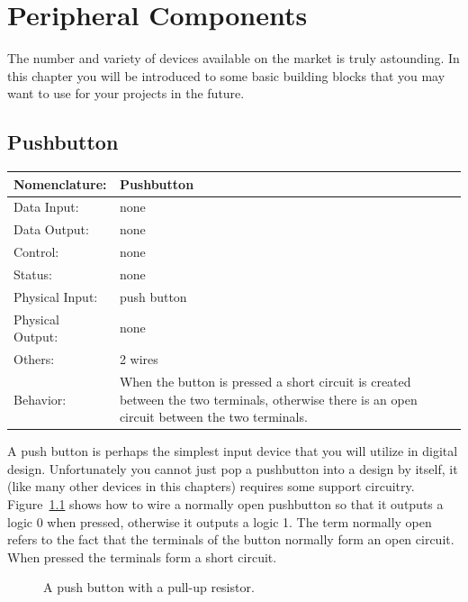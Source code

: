 \chapter{Peripheral Components}
The number and variety of devices available on the market
is truly astounding.  In this chapter you will be introduced
to some basic building blocks that you may want to use for
your projects in the future.


\section{Pushbutton}
\label{page:pushbutton}
\begin{tabular}{|l|p{3.5in}|} \hline
Nomenclature:  & Pushbutton         \\ \hline
Data Input:    & none         \\ \hline
Data Output:   & none   \\ \hline
Control:       & none           \\ \hline
Status:        & none                                   \\ \hline
Physical Input:& push button		\\ \hline
Physical Output:& none		\\ \hline
Others:        & 2 wires             \\ \hline
Behavior:      & When the button is pressed a short circuit is created
between the two terminals, otherwise there is an open circuit between
the two terminals. \\ \hline
\end{tabular}

A push button is perhaps the simplest input device that you will
utilize in digital design.  Unfortunately you cannot just pop
a pushbutton into a design by itself, it (like many other devices
in this chapters) requires some support circuitry.  
Figure~\ref{fig:pushbutton} shows how to wire a normally open
pushbutton so that it outputs a logic 0 when pressed, otherwise 
it outputs a logic 1.  The term normally open refers to the fact
that the terminals of the button normally form an open circuit.
When pressed the terminals form a short circuit.

\begin{figure}[ht]
\caption{A push button with a pull-up resistor.}
\label{fig:pushbutton}
\end{figure}

